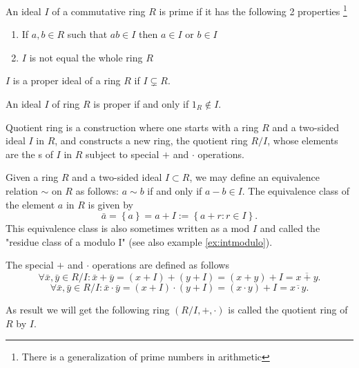\begin{appendices}
\begin{definition}
  An ideal $I$ of a commutative ring $R$ is prime if it has the
  following 2 properties
  \footnote{
    There is a generalization of prime numbers in arithmetic
  }
  \begin{enumerate}
  \item If $a,b \in R$ such that $ab \in I$ then $a \in I$ or $b \in I$
  \item$I$ is not equal the whole ring $R$
  \end{enumerate}
  \label {def:primeideal}
\end{definition}

\begin{definition}
$I$ is a proper ideal of a ring $R$ if $I \subsetneq R$.
\label{def:properideal}
\end{definition}

\begin{theorem}
  An ideal $I$ of ring $R$ is proper if and only if $1_R \notin I$.
  \label{thm:properideal}
\end{theorem}

\begin{definition}
  Quotient ring is a construction where one
  starts with a ring $R$ and a two-sided ideal $I$ in $R$, and constructs a
  new ring, the quotient ring $R/I$, whose elements are the
  s of $I$ 
  in $R$ subject to special $+$ and $\cdot$ operations.

  Given a ring $R$ and a two-sided ideal $I \subset R$, we may define
  an equivalence relation $\sim$ on $R$ as follows: 
  $a \sim b$ if and only if $a - b \in I$.
  The equivalence class of the element $a$ in $R$ is given by
  \[
  \bar{a} = \left\{a\right\} = a + I := \left\{ a + r : r \in I \right\}.
  \]
  This equivalence class is also sometimes written as a mod $I$ and
  called the "residue class of a modulo I" (see also example
  \ref{ex:intmodulo}).

  The special $+$ and $\cdot$ operations are defined as follows
  \[
  \forall \bar{x},\bar{y} \in R/I:
  \bar{x} + \bar{y} = \left(x + I\right) + \left(y + I\right) =
  \left(x+y\right) + I = \overline{x+y}.
  \]
  \[
  \forall \bar{x},\bar{y} \in R/I:
  \bar{x} \cdot \bar{y} = \left(x + I\right) \cdot \left(y + I\right) =
  \left(x \cdot y\right) + I = \overline{x \cdot y}.
  \]

  As result we will get the following ring $\left(R/I, +,
  \cdot\right)$ is called the quotient ring of $R$ by $I$.


\end{definition}
\end{appendices}
